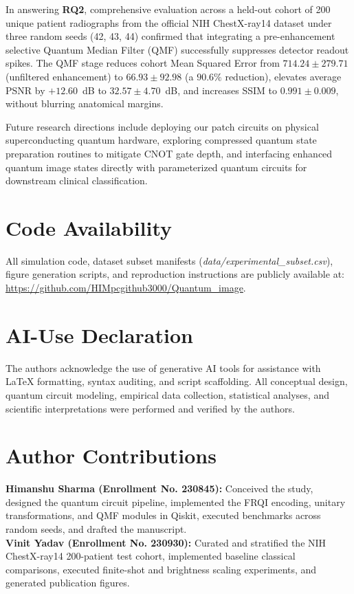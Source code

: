 \documentclass[12pt,onecolumn,draftclsnofoot]{IEEEtran}
\begin{document}
In answering \textbf{RQ2}, comprehensive evaluation across a held-out cohort of 200 unique patient radiographs from the official NIH ChestX-ray14 dataset under three random seeds (42, 43, 44) confirmed that integrating a pre-enhancement selective Quantum Median Filter (QMF) successfully suppresses detector readout spikes. The QMF stage reduces cohort Mean Squared Error from $714.24 \pm 279.71$ (unfiltered enhancement) to $66.93 \pm 92.98$ (a $90.6\%$ reduction), elevates average PSNR by $+12.60$~dB to $32.57 \pm 4.70$~dB, and increases SSIM to $0.991 \pm 0.009$, without blurring anatomical margins.

Future research directions include deploying our patch circuits on physical superconducting quantum hardware, exploring compressed quantum state preparation routines to mitigate CNOT gate depth, and interfacing enhanced quantum image states directly with parameterized quantum circuits for downstream clinical classification.
\section*{Code Availability}
All simulation code, dataset subset manifests (\emph{data/experimental\_subset.csv}), figure generation scripts, and reproduction instructions are publicly available at: \url{https://github.com/HIMpcgithub3000/Quantum_image}.

\section*{AI-Use Declaration}
The authors acknowledge the use of generative AI tools for assistance with LaTeX formatting, syntax auditing, and script scaffolding. All conceptual design, quantum circuit modeling, empirical data collection, statistical analyses, and scientific interpretations were performed and verified by the authors.

\section*{Author Contributions}
\textbf{Himanshu Sharma (Enrollment No. 230845):} Conceived the study, designed the quantum circuit pipeline, implemented the FRQI encoding, unitary transformations, and QMF modules in Qiskit, executed benchmarks across random seeds, and drafted the manuscript. \\
\textbf{Vinit Yadav (Enrollment No. 230930):} Curated and stratified the NIH ChestX-ray14 200-patient test cohort, implemented baseline classical comparisons, executed finite-shot and brightness scaling experiments, and generated publication figures.
\end{document}
